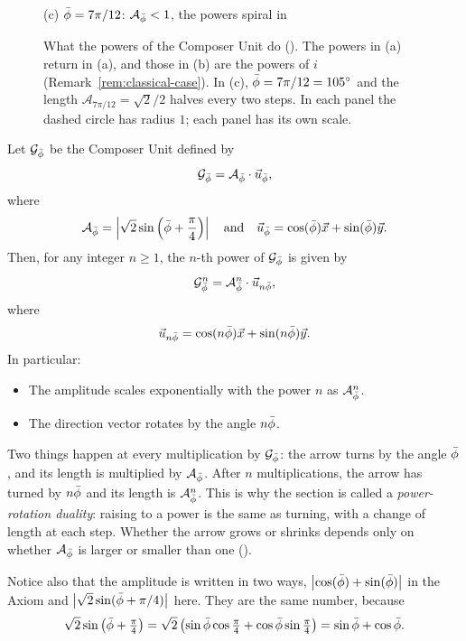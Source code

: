\begin{figure}[tb]
\begin{minipage}[b]{0.32\textwidth}
\smallskip
{\small (c) $\bar{\phi} = 7\pi/12$: $\mathcal{A}_{\bar{\phi}} < 1$, the powers spiral in\par}
\end{minipage}
\caption[What the powers of the Composer Unit do]{What the powers of the Composer Unit do (). The powers in (a) return in (a), and those in (b) are the powers of $i$ (Remark~\ref{rem:classical-case}). In (c), $\bar{\phi} = 7\pi/12 = 105^\circ$ and the length $\mathcal{A}_{7\pi/12} = \sqrt{2}/2$ halves every two steps. In each panel the dashed circle has radius $1$; each panel has its own scale.}
\label{fig:power-regimes}
\end{figure}

\begin{theorem}\label{thm:powers}
Let $\mathcal{G}_{\bar{\phi}}$ be the Composer Unit defined by
\[
\mathcal{G}_{\bar{\phi}} = \mathcal{A}_{\bar{\phi}} \cdot \vec{u}_{\bar{\phi}} ,
\]
where
\[
\mathcal{A}_{\bar{\phi}} = \left| \sqrt{2}\sin\left(\bar{\phi} + \frac{\pi}{4}\right) \right| \quad\text{and}\quad \vec{u}_{\bar{\phi}} = \cos(\bar{\phi})\vec{x} + \sin(\bar{\phi})\vec{y} .
\]
Then, for any integer $n \geq 1$, the $n$-th power of $\mathcal{G}_{\bar{\phi}}$ is given by
\[
\mathcal{G}_{\bar{\phi}}^n = \mathcal{A}_{\bar{\phi}}^n \cdot \vec{u}_{n\bar{\phi}} ,
\]
where
\[
\vec{u}_{n\bar{\phi}} = \cos(n\bar{\phi})\vec{x} + \sin(n\bar{\phi})\vec{y} .
\]
In particular:
\begin{itemize}
  \item The amplitude scales exponentially with the power $n$ as $\mathcal{A}_{\bar{\phi}}^n$.
  \item The direction vector rotates by the angle $n\bar{\phi}$.
\end{itemize}
\end{theorem}

\begin{plainwords}
Two things happen at every multiplication by $\mathcal{G}_{\bar{\phi}}$: the arrow turns by the angle $\bar{\phi}$, and its length is multiplied by $\mathcal{A}_{\bar{\phi}}$. After $n$ multiplications, the arrow has turned by $n\bar{\phi}$ and its length is $\mathcal{A}_{\bar{\phi}}^n$. This is why the section is called a \emph{power-rotation duality}: raising to a power is the same as turning, with a change of length at each step. Whether the arrow grows or shrinks depends only on whether $\mathcal{A}_{\bar{\phi}}$ is larger or smaller than one ().

Notice also that the amplitude is written in two ways, $\left|\cos(\bar{\phi}) + \sin(\bar{\phi})\right|$ in the Axiom and $\left|\sqrt{2}\sin(\bar{\phi} + \pi/4)\right|$ here. They are the same number, because
\[
\sqrt{2}\sin\left(\bar{\phi} + \tfrac{\pi}{4}\right) = \sqrt{2}\left(\sin\bar{\phi} \cos\tfrac{\pi}{4} + \cos\bar{\phi} \sin\tfrac{\pi}{4}\right) = \sin\bar{\phi} + \cos\bar{\phi} .
\]
\end{plainwords}

